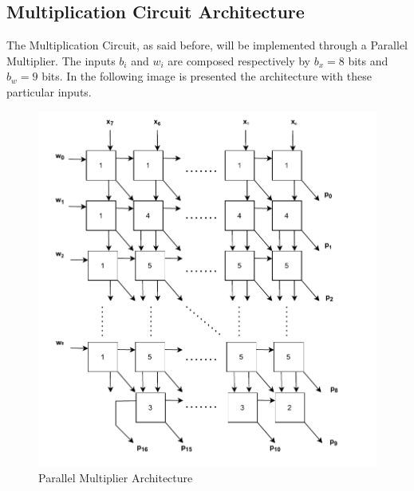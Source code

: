 \subsection{Multiplication Circuit Architecture}
The Multiplication Circuit, as said before, will be implemented through a Parallel Multiplier. The inputs $b_{i}$ and $w_{i}$ are composed respectively by $b_{x} = 8$ bits and $b_{w} = 9$ bits. In the following image is presented the architecture with these particular inputs.
\begin{figure}[H]
	\centering
	\includegraphics[width=13cm]{img/architecture_parallel_multiplier.pdf}
	\caption{Parallel Multiplier Architecture}
\end{figure}
